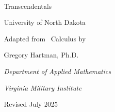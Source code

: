 
%

%

\begin{flushright}

%
\\

\iftoggle{isEarlyTrans}{Early}{Late} Transcendentals

%

{\Large University of North Dakota}\bigskip

\normalsize

Adapted from \apex\ Calculus by

Gregory Hartman, Ph.D.

\emph{\small Department of Applied Mathematics}

\emph{\small Virginia Military Institute}

%

{\small Revised July 2025\forwhom}

\end{flushright}
\normalsize

\restoregeometry
